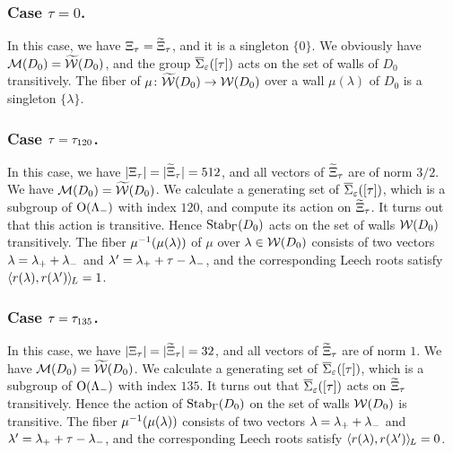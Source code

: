 \documentclass{amsart} %
\begin{document}
\subsubsection{Case $\tau=0$.}
%
In this case,
we have $\Xi_{\tau}=\widetilde{\Xi}_{\tau}$,
and it is a singleton $\{0\}$.
We obviously have $\mathord{\mathcal{M}}(D_0)=\widetilde{\mathord{\mathcal{W}}}(D_0)$,
and the group $\overline{\Sigma}_{\varepsilon} ([\tau])$ acts 
on the set of walls of $D_0$ transitively.
The fiber of $\mu\colon \widetilde{\mathord{\mathcal{W}}}(D_0)\to\mathord{\mathcal{W}}(D_0)$ 
over a wall $\mu(\lambda)$ of $D_0$ is a singleton $\{\lambda\}$.
%
%
\subsubsection{Case $\tau=\tau_{120}$.}
%
In this case,
we have $|\Xi_{\tau}|=|\widetilde{\Xi}_{\tau}|=512$,
and all vectors of $\widetilde{\Xi}_{\tau}$ are of norm $3/2$.
We have $\mathord{\mathcal{M}}(D_0)=\widetilde{\mathord{\mathcal{W}}}(D_0)$.
We calculate a generating set of $\overline{\Sigma}_{\varepsilon} ([\tau])$,
which is a subgroup of $ \mathord{\mathrm{O}}(\Lambda_{-})$ with index $120$,
and compute its action on $\widetilde{\Xi}_{\tau}$.
It turns out that this action is transitive.
Hence $\operatorname{Stab}_{\Gamma}(D_0)$ acts on the set of walls $\mathord{\mathcal{W}}(D_0)$ transitively.
The fiber 
 $\mu^{-1}(\mu(\lambda))$ of $\mu$ over $\lambda\in \mathord{\mathcal{W}}(D_0)$ consists 
of two vectors
$\lambda={\lambda}_{+}+{\lambda}_{-}$ and $\lambda^{\prime}={\lambda}_{+}+\tau-{\lambda}_{-}$, and 
the corresponding Leech roots 
 satisfy
$\langle r(\lambda), r(\lambda^{\prime}) \rangle_{\hskip -1pt L}=1$.
%
\subsubsection{Case $\tau=\tau_{135}$.}
In this case,
we have $|\Xi_{\tau}|=|\widetilde{\Xi}_{\tau}|=32$,
and all vectors of $\widetilde{\Xi}_{\tau}$ are of norm $1$.
We have $\mathord{\mathcal{M}}(D_0)=\widetilde{\mathord{\mathcal{W}}}(D_0)$.
We calculate a generating set of $\overline{\Sigma}_{\varepsilon} ([\tau])$,
which is a subgroup of $ \mathord{\mathrm{O}}(\Lambda_{-})$ with index $135$.
It turns out that $\overline{\Sigma}_{\varepsilon} ([\tau])$ acts on $\widetilde{\Xi}_{\tau}$ transitively.
Hence the action of $\operatorname{Stab}_{\Gamma}(D_0)$ on the set of walls $\mathord{\mathcal{W}}(D_0)$ is transitive.
The fiber 
 $\mu^{-1}(\mu(\lambda))$ 
consists of two vectors
$\lambda={\lambda}_{+}+{\lambda}_{-}$ and $\lambda^{\prime}={\lambda}_{+}+\tau-{\lambda}_{-}$, and 
the corresponding Leech roots 
 satisfy
$\langle r(\lambda), r(\lambda^{\prime}) \rangle_{\hskip -1pt L}=0$.
%
 
\end{document}
